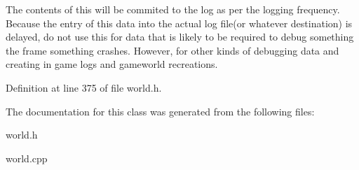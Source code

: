 The contents of this will be commited to the log as per the logging frequency. Because the entry of this data into the actual log file(or whatever destination) is delayed, do not use this for data that is likely to be required to debug something the frame something crashes. However, for other kinds of debugging data and creating in game logs and gameworld recreations. 

Definition at line 375 of file world.h.



The documentation for this class was generated from the following files:\begin{DoxyCompactItemize}
\item 
world.h\item 
world.cpp\end{DoxyCompactItemize}

